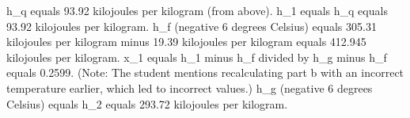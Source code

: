 h_q equals 93.92 kilojoules per kilogram (from above).  
h_1 equals h_q equals 93.92 kilojoules per kilogram.  
h_f (negative 6 degrees Celsius) equals 305.31 kilojoules per kilogram minus 19.39 kilojoules per kilogram equals 412.945 kilojoules per kilogram.  
x_1 equals h_1 minus h_f divided by h_g minus h_f equals 0.2599.  
(Note: The student mentions recalculating part b with an incorrect temperature earlier, which led to incorrect values.)  
h_g (negative 6 degrees Celsius) equals h_2 equals 293.72 kilojoules per kilogram.